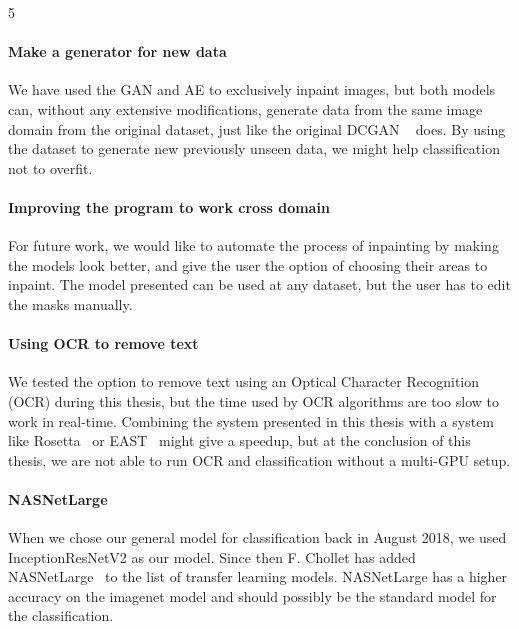 5%

\paragraph{Make a generator for new data}
We have used the GAN and AE to exclusively inpaint images, but both models can, without any extensive modifications,  generate data from the same image domain from the original dataset, just like the original DCGAN ~\cite{DBLP:journals/corr/RadfordMC15} does.  
By using the dataset to generate new previously unseen data, we might help classification not to overfit.

\paragraph{Improving the program to work cross domain}
For future work, we would like to automate the process of inpainting by making the models look better, and give the user the option of choosing their areas to inpaint. The model presented can be used at any dataset, but the user has to edit the masks manually. 

\paragraph{Using OCR to remove text}
We tested the option to remove text using an Optical Character Recognition (OCR) during this thesis, but the time used by OCR algorithms are too slow to work in real-time. Combining the system presented in this thesis with a system like Rosetta~\cite{borisyuk2018rosetta} or EAST~\cite{DBLP:journals/corr/ZhouYWWZHL17} might give a speedup, but at the conclusion of this thesis, we are not able to run OCR and classification without a multi-GPU setup.


\paragraph{NASNetLarge}
When we chose our general model for classification back in August 2018, we used InceptionResNetV2 as our model. Since then F. Chollet has added NASNetLarge~\cite{DBLP:journals/corr/ZophVSL17} to the list of transfer learning models. NASNetLarge has a higher accuracy on the imagenet model and should possibly be the standard model for the classification.


